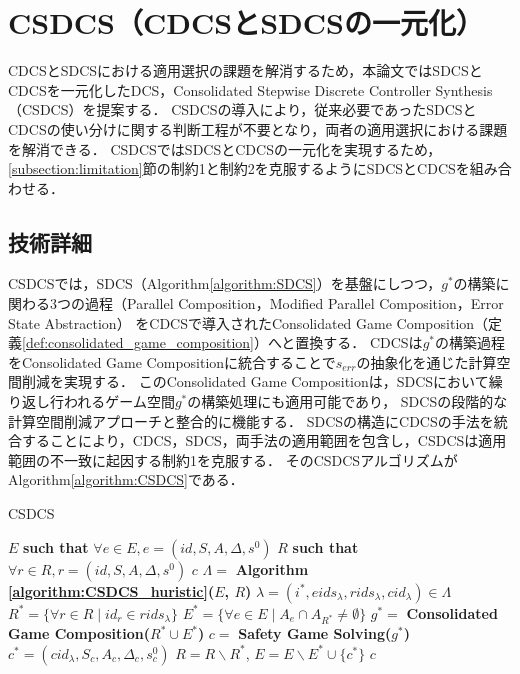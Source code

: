 \section{CSDCS（CDCSとSDCSの一元化）}
\label{section:proposal}
CDCSとSDCSにおける適用選択の課題を解消するため，本論文ではSDCSとCDCSを一元化したDCS，Consolidated Stepwise Discrete Controller Synthesis（CSDCS）を提案する．
CSDCSの導入により，従来必要であったSDCSとCDCSの使い分けに関する判断工程が不要となり，両者の適用選択における課題を解消できる．
CSDCSではSDCSとCDCSの一元化を実現するため，\ref{subsection:limitation}節の制約1と制約2を克服するようにSDCSとCDCSを組み合わせる．

\subsection{技術詳細}
CSDCSでは，SDCS（Algorithm\ref{algorithm:SDCS}）を基盤にしつつ，$g^{*}$の構築に関わる3つの過程（Parallel Composition，Modified Parallel Composition，Error State Abstraction）
をCDCSで導入されたConsolidated Game Composition（定義\ref{def:consolidated_game_composition}）へと置換する．
CDCSは$g^{*}$の構築過程をConsolidated Game Compositionに統合することで$s_{err}$の抽象化を通じた計算空間削減を実現する．
このConsolidated Game Compositionは，SDCSにおいて繰り返し行われるゲーム空間$g^{*}$の構築処理にも適用可能であり，
SDCSの段階的な計算空間削減アプローチと整合的に機能する．
SDCSの構造にCDCSの手法を統合することにより，CDCS，SDCS，両手法の適用範囲を包含し，CSDCSは適用範囲の不一致に起因する制約1を克服する．
そのCSDCSアルゴリズムがAlgorithm\ref{algorithm:CSDCS}である．

\begin{algorithm}[h]
\caption{CSDCS}
\label{algorithm:CSDCS}
\begin{algorithmic}[1]
\renewcommand{\algorithmicrequire}{\textbf{Input:}}
\renewcommand{\algorithmicensure}{\textbf{Output:}}
\REQUIRE $E$ {\bf such that} $\forall e \in E, e = (id, S, A, \Delta, s^0)$
\REQUIRE $R$ {\bf such that} $\forall r \in R, r = (id, S, A, \Delta, s^0)$
\ENSURE $c$
\STATE $\Lambda =$ {\bf Algorithm \ref{algorithm:CSDCS_huristic}($E$, $R$)}
    \STATE $\lambda = (i^*, eids_{\lambda}, rids_{\lambda}, cid_{\lambda}) \in \Lambda$
    \STATE $R^* = \{\forall r \in R \mid id_{r} \in rids_{\lambda}\}$
    \STATE $E^* = \{\forall e \in E \mid A_{e} \cap A_{R^*} \neq \emptyset\}$
    \STATE $g^* =$ {\bf Consolidated Game Composition($R^* \cup E^*$)}
    \STATE $c   =$ {\bf Safety Game Solving($g^*$)}
    \STATE $c^* = (cid_{\lambda}, S_{c}, A_{c}, \Delta_{c}, s^0_{c})$
    \STATE $R   = R \backslash R^*$, $E = E \backslash E^* \cup \{c^*\}$
\ENDFOR
{} $c$
\end{algorithmic}
\end{algorithm}

